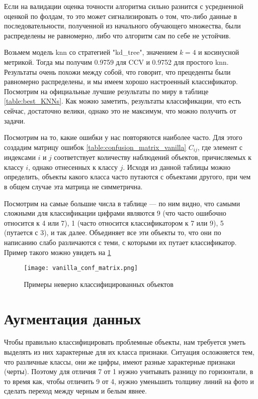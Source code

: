 \documentclass{article}
\begin{document}
    \begin{leftrule}
        Если на валидации оценка точности алгоритма сильно разнится с усредненной оценкой по фолдам, то это может сигнализировать о том, что-либо данные в последовательности, полученной из начального обучающего множества, были распределены не равномерно, либо что алгоритм сам по себе не устойчив.
    \end{leftrule}
    
    Возьмем модель knn со стратегией "kd\_tree", значением $k = 4$ и косинусной метрикой. Тогда мы получим 0.9759 для CCV и 0.9752 для простого knn. Результаты очень похожи между собой, что говорит, что прецеденты были равномерно распределены, и мы имеем хорошо настроенный классификатор. Посмотрим на официальные лучшие результаты по миру в таблице \ref{table:best_KNNs}. Как можно заметить, результаты классификации, что есть сейчас, достаточно велики, однако это не максимум, что можно получить от задачи. 
    
    
    Посмотрим на то, какие ошибки у нас повторяются наиболее часто. Для этого создадим матрицу ошибок \ref{table:confusion_matrix_vanilla} $C_{ij}$, где элемент с индексами $i$ и $j$ соответствует количеству наблюдений объектов, причисляемых к классу $i$, однако отнесенных к классу $j$. Исходя из данной таблицы можно определить, объекты какого класса часто путаются с объектами другого, при чем в общем случае эта матрица не симметрична.

    Посмотрим на самые большие числа в таблице — по ним видно, что самыми сложными для классификации цифрами являются 9 (что часто ошибочно относится к 4 или 7), 1 (часто относится классификатором к 7 или 9), 5 (путается с 3), и так далее. Объединяет все эти объекты то, что они по написанию слабо различаются с теми, с которыми их путает классификатор. Пример такого можно увидеть на \ref{fig:vanilla_conf_matrix}

    \begin{figure}[h]
        \centering
        \texttt{[image: vanilla\_conf\_matrix.png]}
        \caption{Примеры неверно классифицированных объектов}
        \label{fig:vanilla_conf_matrix}
    \end{figure}


\section{Аугментация данных}
    Чтобы правильно классифицировать проблемные объекты, нам требуется уметь выделять из них характерные для их класса признаки. Ситуация осложняется тем, что различные классы, они же цифры, имеют разные характерные признаки (черты). Поэтому для отличия 7 от 1 нужно учитывать разницу по горизонтали, в то время как, чтобы отличить 9 от 4, нужно уменьшить толщину линий на фото и сделать переход между черным и белым явнее. 
\end{document}

